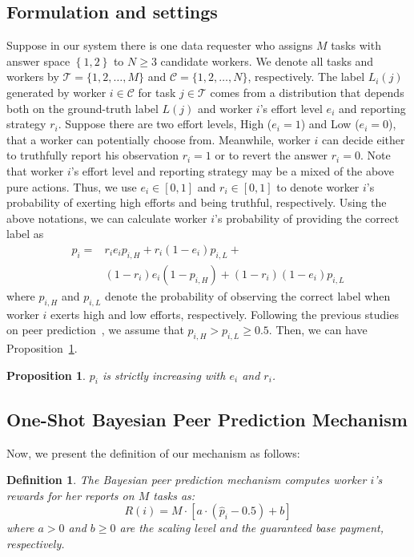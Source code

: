 \documentclass{article}
\newtheorem{proposition}[theorem]{Proposition}
\newtheorem{definition}{Definition}
\begin{document}
\subsection{Formulation and settings}
Suppose in our system there is one data requester who assigns $M$ tasks with answer space $\left\{1,2\right\}$ to $N \geq 3$ candidate workers.
We denote all tasks and workers by $\mathcal{T}=\{1,2,\ldots,M\}$ and $\mathcal{C}=\{1,2,\ldots,N\}$, respectively.
The label $L_{i}(j)$ generated by worker $i\in \mathcal{C}$ for task $j\in\mathcal{T}$ comes from a distribution that depends both on the ground-truth label $L(j)$ and worker $i$'s effort level $e_i$ and reporting strategy $r_i$.
Suppose there are two effort levels, High ($e_i=1$) and Low ($e_i=0$), that a worker can potentially choose from.
Meanwhile, worker $i$ can decide either to truthfully report his observation $r_i = 1$ or to revert the answer $r_i = 0$.
Note that worker $i$'s effort level and reporting strategy may be a mixed of the above pure actions.
Thus, we use $e_i\in[0,1]$ and $r_i\in[0,1]$ to denote worker $i$'s probability of exerting high efforts and being truthful, respectively.
Using the above notations, we can calculate worker $i$'s probability of providing the correct label as
\begin{equation}
\begin{split}
p_i=&r_i e_i p_{i, H}+r_i (1-e_i) p_{i, L}+\\
&(1-r_i) e_i (1-p_{i, H})+(1-r_i) (1-e_i) p_{i, L}
\end{split}
\end{equation}
where $p_{i, H}$ and $p_{i, L}$ denote the probability of observing the correct label when worker $i$ exerts high and low efforts, respectively.
Following the previous studies on peer prediction~\cite{dasgupta2013crowdsourced}, we assume that $p_{i, H}>p_{i, L}\geq 0.5$.
Then, we can have Proposition~\ref{Incre}.
\begin{proposition}
\label{Incre}
$p_i$ is strictly increasing with $e_i$ and $r_i$.  
\end{proposition}

\subsection{One-Shot Bayesian Peer Prediction Mechanism}
Now, we present the definition of our mechanism as follows:
\begin{definition}
The Bayesian peer prediction mechanism computes worker $i$'s rewards for her reports on $M$ tasks as:
\begin{equation}
R(i)=M\cdot \left[a\cdot (\hat{p}_i-0.5) +b\right]
\end{equation}
where $a>0$ and $b\geq 0$ are the scaling level and the guaranteed base payment, respectively.
\end{definition}
\end{document}
